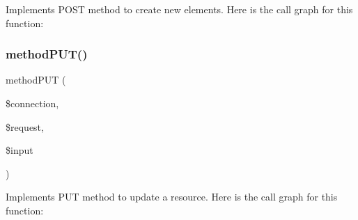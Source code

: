 Implements P\+O\+ST method to create new elements. Here is the call graph for this function\+:
\mbox{\label{crud_method_8php_a900949fd105f15a37b23c83894131d8b}} 
\subsubsection{\texorpdfstring{method\+P\+U\+T()}{methodPUT()}}
{\footnotesize\ttfamily method\+P\+UT (\begin{DoxyParamCaption}\item[{}]{\$connection,  }\item[{}]{\$request,  }\item[{}]{\$input }\end{DoxyParamCaption})}

Implements P\+UT method to update a resource. Here is the call graph for this function\+:

